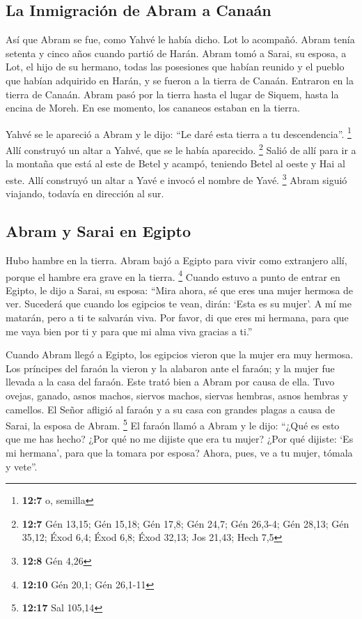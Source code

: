\hypertarget{la-inmigraciuxf3n-de-abram-a-canauxe1n}{%
\subsection{La Inmigración de Abram a
Canaán}\label{la-inmigraciuxf3n-de-abram-a-canauxe1n}}

 Así que Abram se fue, como Yahvé le había dicho. Lot lo
acompañó. Abram tenía setenta y cinco años cuando partió de Harán.
 Abram tomó a Sarai, su esposa, a Lot, el hijo de su
hermano, todas las posesiones que habían reunido y el pueblo que habían
adquirido en Harán, y se fueron a la tierra de Canaán. Entraron en la
tierra de Canaán.  Abram pasó por la tierra hasta el lugar
de Siquem, hasta la encina de Moreh. En ese momento, los cananeos
estaban en la tierra.

 Yahvé se le apareció a Abram y le dijo: ``Le daré esta
tierra a tu descendencia''. \footnote{\textbf{12:7} o, semilla} Allí
construyó un altar a Yahvé, que se le había aparecido. \footnote{\textbf{12:7}
  Gén 13,15; Gén 15,18; Gén 17,8; Gén 24,7; Gén 26,3-4; Gén 28,13; Gén
  35,12; Éxod 6,4; Éxod 6,8; Éxod 32,13; Jos 21,43; Hech 7,5}
 Salió de allí para ir a la montaña que está al este de
Betel y acampó, teniendo Betel al oeste y Hai al este. Allí construyó un
altar a Yavé e invocó el nombre de Yavé. \footnote{\textbf{12:8} Gén
  4,26}  Abram siguió viajando, todavía en dirección al
sur.

\hypertarget{abram-y-sarai-en-egipto}{%
\subsection{Abram y Sarai en Egipto}\label{abram-y-sarai-en-egipto}}

 Hubo hambre en la tierra. Abram bajó a Egipto para vivir
como extranjero allí, porque el hambre era grave en la tierra.
\footnote{\textbf{12:10} Gén 20,1; Gén 26,1-11}  Cuando
estuvo a punto de entrar en Egipto, le dijo a Sarai, su esposa: ``Mira
ahora, sé que eres una mujer hermosa de ver.  Sucederá
que cuando los egipcios te vean, dirán: `Esta es su mujer'. A mí me
matarán, pero a ti te salvarán viva.  Por favor, di que
eres mi hermana, para que me vaya bien por ti y para que mi alma viva
gracias a ti.''

 Cuando Abram llegó a Egipto, los egipcios vieron que la
mujer era muy hermosa.  Los príncipes del faraón la
vieron y la alabaron ante el faraón; y la mujer fue llevada a la casa
del faraón.  Este trató bien a Abram por causa de ella.
Tuvo ovejas, ganado, asnos machos, siervos machos, siervas hembras,
asnos hembras y camellos.  El Señor afligió al faraón y a
su casa con grandes plagas a causa de Sarai, la esposa de Abram.
\footnote{\textbf{12:17} Sal 105,14}  El faraón llamó a
Abram y le dijo: ``¿Qué es esto que me has hecho? ¿Por qué no me dijiste
que era tu mujer?  ¿Por qué dijiste: `Es mi hermana',
para que la tomara por esposa? Ahora, pues, ve a tu mujer, tómala y
vete''.

